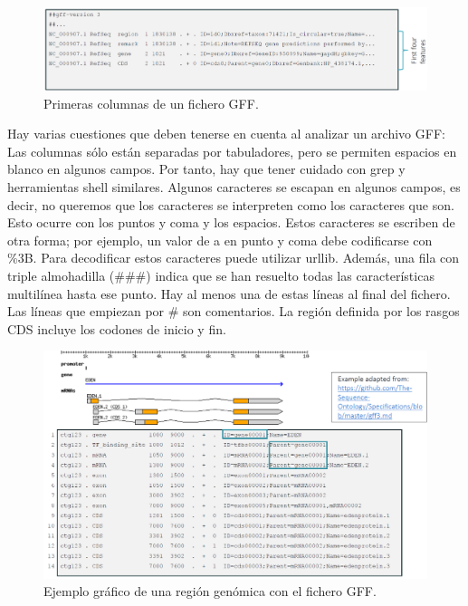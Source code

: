 \begin{figure}[htbp]
\centering
\includegraphics[width = \textwidth]{figs/gff.png}
\caption{Primeras columnas de un fichero GFF.}
\label{fig:gff}
\end{figure}

Hay varias cuestiones que deben tenerse en cuenta al analizar un archivo GFF: Las columnas sólo están separadas por tabuladores, pero se permiten espacios en blanco en algunos campos. Por tanto, hay que tener cuidado con grep y herramientas shell similares. Algunos caracteres se escapan en algunos campos, es decir, no queremos que los caracteres se interpreten como los caracteres que son. Esto ocurre con los puntos y coma y los espacios. Estos caracteres se escriben de otra forma; por ejemplo, un valor de a en punto y coma debe codificarse con \%3B. Para decodificar estos caracteres puede utilizar urllib. Además, una fila con triple almohadilla (\#\#\#) indica que se han resuelto todas las características multilínea hasta ese punto. Hay al menos una de estas líneas al final del fichero. Las líneas que empiezan por \# son comentarios. La región definida por los rasgos CDS incluye los codones de inicio y fin.

\begin{figure}[htbp]
\centering
\includegraphics[width = \textwidth]{figs/gff-graph.png}
\caption{Ejemplo gráfico de una región genómica con el fichero GFF.}
\label{fig:gff-graph}
\end{figure}
